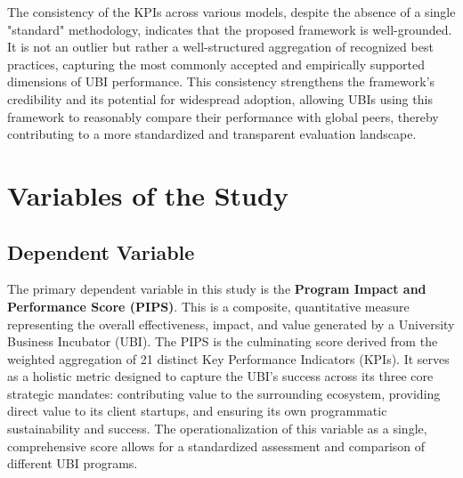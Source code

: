 \documentclass[../Main.tex]{subfiles}
\begin{document}
The consistency of the KPIs across various models, despite the absence of a single "standard" methodology, indicates that the proposed framework is well-grounded. It is not an outlier but rather a well-structured aggregation of recognized best practices, capturing the most commonly accepted and empirically supported dimensions of UBI performance. This consistency strengthens the framework's credibility and its potential for widespread adoption, allowing UBIs using this framework to reasonably compare their performance with global peers, thereby contributing to a more standardized and transparent evaluation landscape.

\section{Variables of the Study}

\subsection{Dependent Variable}
The primary dependent variable in this study is the \textbf{Program Impact and Performance Score (PIPS)}. This is a composite, quantitative measure representing the overall effectiveness, impact, and value generated by a University Business Incubator (UBI). The PIPS is the culminating score derived from the weighted aggregation of 21 distinct Key Performance Indicators (KPIs). It serves as a holistic metric designed to capture the UBI's success across its three core strategic mandates: contributing value to the surrounding ecosystem, providing direct value to its client startups, and ensuring its own programmatic sustainability and success. The operationalization of this variable as a single, comprehensive score allows for a standardized assessment and comparison of different UBI programs.
\end{document}
